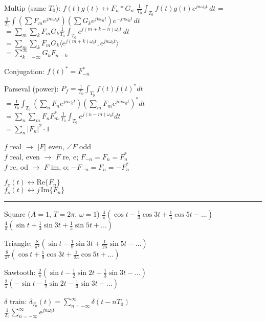 \documentclass[4pt]{article}
\theoremstyle{definition}
\theoremstyle{definition}
\renewcommand{\o}{\omega}
\newcommand{\ra}{\rightarrow}
\newcommand{\lra}{\leftrightarrow}
\begin{document}
\begin{multicols}{3}
    Multip (same $T_0$): $f(t) g(t) \lra F_n * G_n$ 
        $\frac 1{T_0}  \int_{T_0} f(t) g(t) e^{jn\o_0 t}\, dt$ =\\
        $ \frac{1}{T_0} \int (\sum F_m e^{jm\o_0 t}) (\sum G_k e^{jk\o_0 t}) e^{-jn\o_0 t} \, dt$ \\
        $ = \sum_m \sum_k F_m G_k \frac{1}{T_0} \int_{T_0} e^{j(m+k-n)\o_0 t} \, dt$\\
        $ = \sum_m \sum_k F_m G_k \langle e^{j(m+k)\o_0 t}, e^{jn\o_0 t}\rangle$\\
        $ = \sum_{k=-\infty}^{\infty} G_k F_{n-k}$
        
    Conjugation: $f(t)^* = F^*_{-n}$

    Parseval (power): \(P_f = \frac 1{T_0}\int_{T_0} f(t) f(t)^* dt\)\\
    \(=\frac{1}{T_0}\int_{T_0} (\sum_n F_n e^{jn\o_0t})(\sum_m F_m e^{jm\o_0t})^* dt\)\\
    \(=\sum_n \sum_m  F_n F_m^* \, \frac{1}{T_0}\int_{T_0} e^{j(n-m)\o_0t} dt\)\\
    \(=\sum_n |F_n|^2 \cdot 1\)

        $f$ real $\ra$ $|F|$ even, $\angle F$ odd\\
        $f$ real, even $\ra$ $F$ re, e; $F_{-n} = F_n = F_n^*$\\
        $f$ re, od $\ra$ $F$ im, o; $-F_{-n} = F_n = -F_n^*$

        $f_e(t) \lra \mathrm{Re}\{ F_n\}$\\
        $f_o(t) \lra j \,\mathrm{Im} \{F_n\}$
\rule{\linewidth}{0.5pt}
    Square ($A=1$, $T=2\pi$, $\omega = 1$) 
        $\frac{4}{\pi}(\cos t - \frac{1}{3}\cos 3t + \frac{1}{5} \cos 5t- ...)$\\
        $\frac{4}{\pi}(\sin t + \frac 1 3 \sin 3t + \frac 1 5 \sin 5t + ...)$

    Triangle: 
        $\frac{8}{\pi^2}(\sin t - \frac{1}{9} \sin 3t + \frac{1}{25} \sin 5t - ...)$\\
        $\frac{8}{\pi^2}(\cos t + \frac 1 9 \cos 3t + \frac 1 {25} \cos 5t + ...)$

    Sawtooth:   
        $\frac 2{\pi} (\sin t - \frac{1}{2} \sin 2t + \frac{1}{3} \sin 3t - ...)$\\
        $\frac 2{\pi} (-\sin t - \frac{1}{2} \sin 2t - \frac{1}{3} \sin 3t - ...)$

    $\delta$ train:     
        $\delta_{T_0} (t) = \sum_{n=-\infty}^{\infty} \delta(t - nT_0)$ \\
        $\frac{1}{T_0} \sum_{n=-\infty}^{\infty} e^{jn\omega_0 t}$


\end{multicols}
\end{document}
